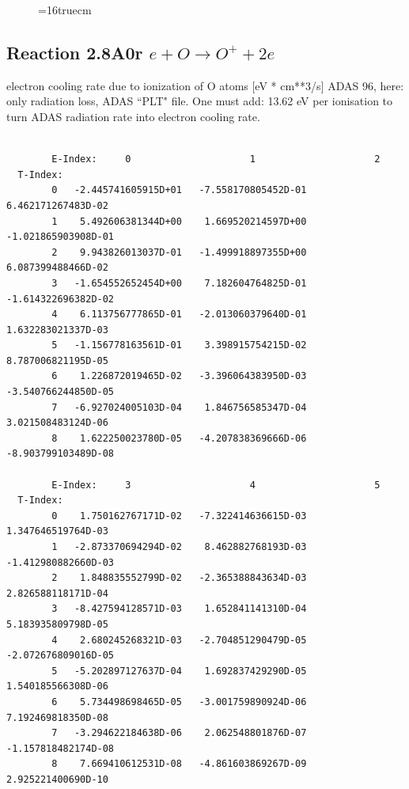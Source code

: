 \documentclass[12pt,dvipdfmx]{article}
\begin{document}
\begin{figure} \label{2.8il}
\epsfxsize=16truecm 
\end{figure}
\newpage

\subsection{
  Reaction 2.8A0r  $e + O  \rightarrow O^+   + 2e $
}
electron cooling rate due to ionization of O atoms [eV * cm**3/s]
ADAS 96, here: only radiation loss, ADAS ``PLT" file.
One must add: 13.62 eV per ionisation to turn ADAS radiation
rate into electron cooling rate.


\begin{small}\begin{verbatim}

        E-Index:     0                     1                     2
  T-Index:
        0   -2.445741605915D+01   -7.558170805452D-01    6.462171267483D-02
        1    5.492606381344D+00    1.669520214597D+00   -1.021865903908D-01
        2    9.943826013037D-01   -1.499918897355D+00    6.087399488466D-02
        3   -1.654552652454D+00    7.182604764825D-01   -1.614322696382D-02
        4    6.113756777865D-01   -2.013060379640D-01    1.632283021337D-03
        5   -1.156778163561D-01    3.398915754215D-02    8.787006821195D-05
        6    1.226872019465D-02   -3.396064383950D-03   -3.540766244850D-05
        7   -6.927024005103D-04    1.846756585347D-04    3.021508483124D-06
        8    1.622250023780D-05   -4.207838369666D-06   -8.903799103489D-08

        E-Index:     3                     4                     5
  T-Index:
        0    1.750162767171D-02   -7.322414636615D-03    1.347646519764D-03
        1   -2.873370694294D-02    8.462882768193D-03   -1.412980882660D-03
        2    1.848835552799D-02   -2.365388843634D-03    2.826588118171D-04
        3   -8.427594128571D-03    1.652841141310D-04    5.183935809798D-05
        4    2.680245268321D-03   -2.704851290479D-05   -2.072676809016D-05
        5   -5.202897127637D-04    1.692837429290D-05    1.540185566308D-06
        6    5.734498698465D-05   -3.001759890924D-06    7.192469818350D-08
        7   -3.294622184638D-06    2.062548801876D-07   -1.157818482174D-08
        8    7.669410612531D-08   -4.861603869267D-09    2.925221400690D-10


\end{verbatim}
\end{small}
\end{document}
